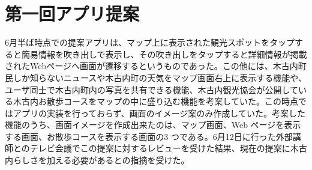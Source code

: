 \documentclass[openany,11pt,papersize]{jsbook}
\begin{document}
\section{第一回アプリ提案}
6月半ば時点での提案アプリは、マップ上に表示された観光スポットをタップすると簡易情報を吹き出しで表示し、その吹き出しをタップすると詳細情報が掲載されたWebページへ画面が遷移するというものであった。この他には、木古内町民しか知らないニュースや木古内町の天気をマップ画面右上に表示する機能や、ユーザ同士で木古内町内の写真を共有できる機能、木古内観光協会が公開している木古内お散歩コースをマップの中に盛り込む機能を考案していた。この時点ではアプリの実装を行っておらず、画面のイメージ案のみ作成していた。考案した機能のうち、画面イメージを作成出来たのは、マップ画面、Web ページを表示する画面、お散歩コースを表示する画面の3 つである。6月12日に行った外部講師とのテレビ会議でこの提案に対するレビューを受けた結果、現在の提案に木古内らしさを加える必要があるとの指摘を受けた。

\end{document}
